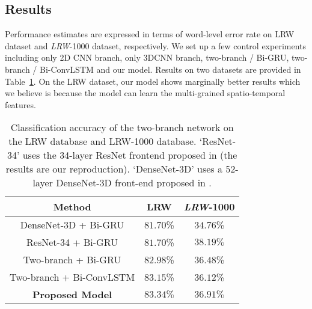 \documentclass{bmvc2k}
\begin{document}
\subsection{Results}
Performance estimates are expressed in terms of word-level error rate on LRW dataset and \textit{LRW}-1000 dataset, respectively. We set up a few control experiments including only 2D CNN branch, only 3DCNN branch, two-branch / Bi-GRU, two-branch / Bi-ConvLSTM and our model. Results on two datasets are provided in Table~\ref{tab:lrw-results}. On the LRW dataset, our model shows marginally better results
which we believe is because the model can learn the multi-grained spatio-temporal features. 

\begin{table}[]
\caption{Classification accuracy of the two-branch network on the LRW database and LRW-1000 database. `ResNet-34' uses the 34-layer ResNet frontend proposed in \cite{1petridis2018end} (the results are our reproduction). `DenseNet-3D' uses a 52-layer DenseNet-3D front-end proposed in \cite{yang2018lrw}.}
\centering
 \vspace{+1em}
\begin{tabular}{|c|c|c|}
\hline
\textbf{Method}                & \textbf{LRW}        & \textbf{\textit{LRW}-1000} \\ \hline
DenseNet-3D + Bi-GRU     & $81.70$\%          & $34.76$\% \cite{yang2018lrw}       \\ \hline
ResNet-34 + Bi-GRU       & $81.70$\%          & $\mathbf{38.19}\%$ \cite{yang2018lrw}        \\ \hline
Two-branch + Bi-GRU      & $82.98$\%          & $36.48$\%            \\ \hline
Two-branch + Bi-ConvLSTM & $83.15$\%          & $36.12$\%            \\ \hline
\textbf{Proposed Model}    & $\mathbf{83.34\%}$ & $36.91\%$   \\ \hline
\end{tabular}
\label{tab:lrw-results}
\vspace{-1em}
\end{table}
\end{document}
